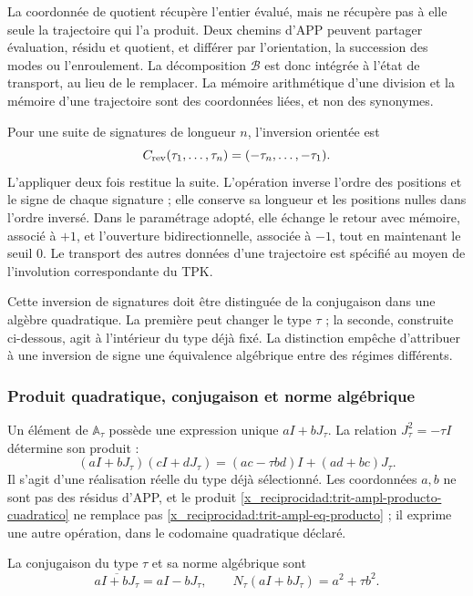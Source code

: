 La coordonnée de quotient récupère l'entier évalué, mais ne récupère pas à elle seule la trajectoire qui l'a produit. Deux chemins d'APP peuvent partager évaluation, résidu et quotient, et différer par l'orientation, la succession des modes ou l'enroulement. La décomposition \(\mathcal B\) est donc intégrée à l'état de transport, au lieu de le remplacer. La mémoire arithmétique d'une division et la mémoire d'une trajectoire sont des coordonnées liées, et non des synonymes.

Pour une suite de signatures de longueur \(n\), l'inversion orientée est
\[
 C_{\rm rev}(\tau_1,\ldots,\tau_n)
   =(-\tau_n,\ldots,-\tau_1).
\]
L'appliquer deux fois restitue la suite. L'opération inverse l'ordre des
positions et le signe de chaque signature ; elle conserve sa longueur et les
positions nulles dans l'ordre inversé. Dans le paramétrage adopté,
elle échange le retour avec mémoire, associé à \(+1\), et l'ouverture
bidirectionnelle, associée à \(-1\), tout en maintenant le seuil \(0\). Le transport
des autres données d'une trajectoire est spécifié au moyen de
l'involution correspondante du TPK.

Cette inversion de signatures doit être distinguée de la conjugaison dans une
algèbre quadratique. La première peut changer le type \(\tau\) ; la seconde,
construite ci-dessous, agit à l'intérieur du type déjà fixé. La
distinction empêche d'attribuer à une inversion de signe une équivalence
algébrique entre des régimes différents.

\subsubsection{Produit quadratique, conjugaison et norme algébrique}
\label{x_reciprocidad:trit-ampl-norma}

Un élément de \(\mathbb A_\tau\) possède une expression unique \(aI+bJ_\tau\). La relation \(J_\tau^2=-\tau I\) détermine son produit :
\begin{equation}
 (aI+bJ_\tau)(cI+dJ_\tau)
   =(ac-\tau bd)I+(ad+bc)J_\tau.
 \label{x_reciprocidad:trit-ampl-producto-cuadratico}
\end{equation}
Il s'agit d'une réalisation réelle du type déjà sélectionné. Les coordonnées \(a,b\) ne sont pas des résidus d'APP, et le produit \eqref{x_reciprocidad:trit-ampl-producto-cuadratico} ne remplace pas \eqref{x_reciprocidad:trit-ampl-eq-producto} ; il exprime une autre opération, dans le codomaine quadratique déclaré.

\begin{definition}
\label{x_reciprocidad:trit-ampl-def-norma}
La conjugaison du type \(\tau\) et sa norme algébrique sont
\[
 \overline{aI+bJ_\tau}=aI-bJ_\tau,\qquad
 N_\tau(aI+bJ_\tau)=a^2+\tau b^2.
\]
\end{definition}


